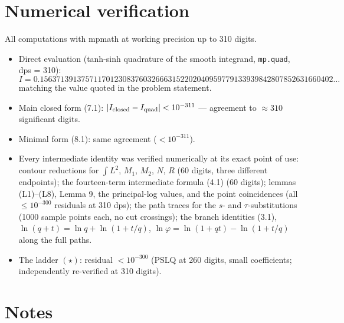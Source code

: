 \documentclass[11pt]{article}
\theoremstyle{remark}
\begin{document}
\section*{Numerical verification}

All computations with mpmath at working precision up to 310 digits.

\begin{itemize}
\item Direct evaluation (tanh-sinh quadrature of the smooth integrand, \texttt{mp.quad}, dps = 310):
  \[
  I=0.15637139137571170123083760326663152202040959779133939842807852631660402\ldots
  \]
  matching the value quoted in the problem statement.
\item Main closed form (7.1): $|I_{\rm closed}-I_{\rm quad}|<10^{-311}$ --- agreement to $\approx310$ significant digits.
\item Minimal form (8.1): same agreement ($<10^{-311}$).
\item Every intermediate identity was verified numerically at its exact point of use:
  contour reductions for $\int L^2$, $M_1$, $M_2$, $N$, $R$ (60 digits, three different endpoints);
  the fourteen-term intermediate formula (4.1) (60 digits);
  lemmas (L1)--(L8), Lemma 9, the principal-log values, and the point coincidences (all $\le10^{-300}$ residuals at 310 dps);
  the path traces for the $s$- and $\tau$-substitutions (1000 sample points each, no cut crossings);
  the branch identities (3.1), $\ln(q+t)=\ln q+\ln(1+t/q)$, $\ln\varphi=\ln(1+qt)-\ln(1+t/q)$ along the full paths.
\item The ladder $(\star)$: residual $<10^{-300}$ (PSLQ at 260 digits, small coefficients; independently re-verified at 310 digits).
\end{itemize}

\section*{Notes}
\end{document}
